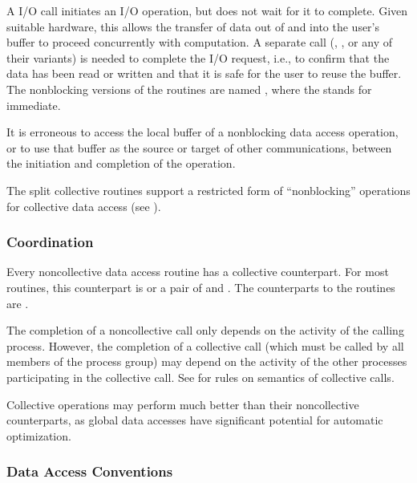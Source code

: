 A  I/O call initiates an I/O operation, but does not
wait for it to complete.  Given suitable hardware, this allows the
transfer of data out of and into the user's buffer to proceed concurrently with
computation.  A separate  call
(, , or any of their variants) is
needed to complete the I/O request,
i.e., to confirm that the data has been read or written and that
it is safe for the user to reuse the buffer.
The nonblocking versions of the routines are named
, where the  stands for immediate.

It is erroneous to access the local buffer of a nonblocking
data access operation, or to use that buffer as the source or
target of other communications, between the initiation and
completion of the operation. 

The split collective routines
support a restricted form of ``nonblocking'' operations
for collective data access
(see ).

\subsubsection{Coordination}

Every noncollective data access routine 
has a collective counterpart.  For most routines, this counterpart
is  or a pair of 
 and 
.
The counterparts to the  routines are 
.

The completion of a noncollective call only depends on the activity of
the calling process.
However, the completion of a collective call
(which must be called by all members of the process group)
may depend on the activity
of the other processes participating in the collective call.
See 
for rules on semantics of collective calls.

Collective operations
may perform much better than their noncollective counterparts,
as global data accesses have significant potential for automatic optimization.

\subsubsection{Data Access Conventions}
\label{sec:io-data-access-conventions}

